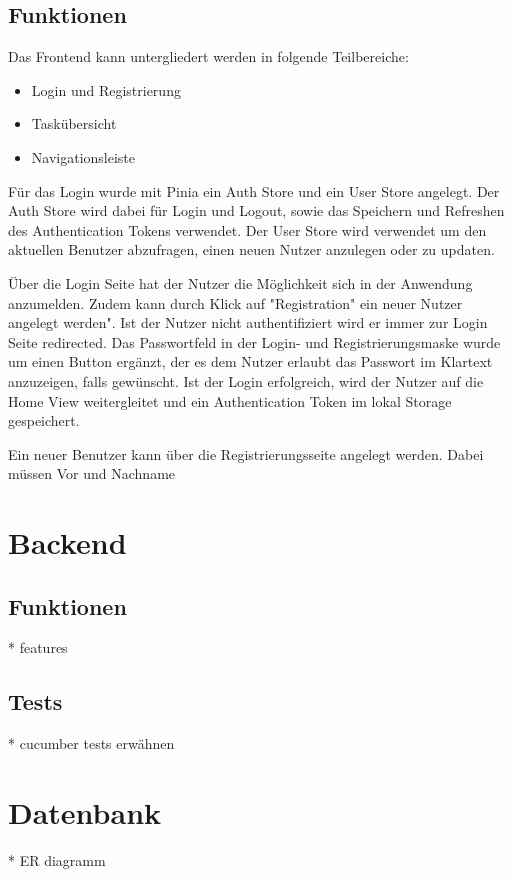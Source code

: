 \documentclass[a4paper, 12pt]{article}
\begin{document}
    \subsection{Funktionen}
    Das Frontend kann untergliedert werden in folgende Teilbereiche:

    \begin{itemize}
        \item Login und Registrierung
        \item Taskübersicht
        \item Navigationsleiste
    \end{itemize}

    Für das Login wurde mit Pinia ein Auth Store und ein User Store angelegt. Der Auth Store wird dabei für Login und Logout, sowie das Speichern und Refreshen des Authentication Tokens verwendet.
    Der User Store wird verwendet um den aktuellen Benutzer abzufragen, einen neuen Nutzer anzulegen oder zu updaten.
    
    Über die Login Seite hat der Nutzer die Möglichkeit sich in der Anwendung anzumelden. Zudem kann durch Klick auf "Registration" ein neuer Nutzer angelegt werden". Ist der Nutzer nicht authentifiziert wird
    er immer zur Login Seite redirected. Das Passwortfeld in der Login- und Registrierungsmaske wurde um einen Button ergänzt, der es dem Nutzer erlaubt das Passwort im Klartext anzuzeigen, falls gewünscht.
    Ist der Login erfolgreich, wird der Nutzer auf die Home View weitergleitet und ein Authentication Token im lokal Storage gespeichert.

    Ein neuer Benutzer kann über die Registrierungsseite angelegt werden. Dabei müssen Vor und Nachname

    \section{Backend}
    \subsection{Funktionen}
    * features

    \subsection{Tests}
    * cucumber tests erwähnen

    \section{Datenbank}
    * ER diagramm
\end{document}
